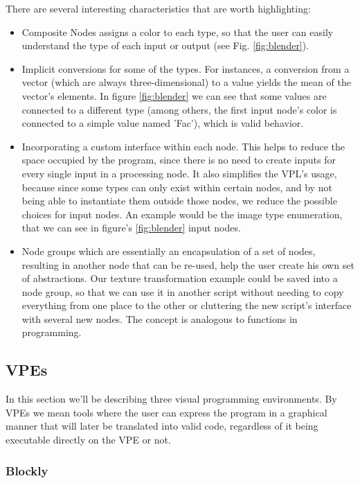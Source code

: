 There are several interesting characteristics that are worth highlighting:
\begin{itemize}
  \item Composite Nodes assigns a color to each type, so that the user can
easily understand the type of each input or output (see Fig. \ref{fig:blender}).
  \item Implicit conversions for some of the types. For instances,
a conversion from a vector (which are always three-dimensional) to a value yields
the mean of the vector's elements. In figure \ref{fig:blender} we can see that
some values are connected to a different type (among others, the first input
node's color is connected to a simple value named 'Fac'), which is valid behavior.
  \item Incorporating a custom interface within each node. This helps to reduce
the space occupied by the program, since there is no need to create inputs for
every single input in a processing node. It also simplifies the VPL's usage,
because since some types can only exist within certain nodes, and by not being
able to instantiate them outside those nodes, we reduce the possible choices
for input nodes. An example would be the image type enumeration, that we can
see in figure's \ref{fig:blender} input nodes.
  \item Node groups which are essentially an encapsulation
of a set of nodes, resulting in another node that can be re-used, help the user
create his own set of abstractions. Our texture transformation example could
be saved into a node group, so that we can use it in another script without
needing to copy everything from one place to the other or cluttering the new
script's interface with several new nodes. The concept is analogous to functions
in programming.
\end{itemize}

\subsection{VPEs}

In this section we'll be describing three visual programming environments. By VPEs
we mean tools where the user can express the program in a graphical manner that will
later be translated into valid code, regardless of it being executable directly
on the VPE or not.

\subsubsection{Blockly}

